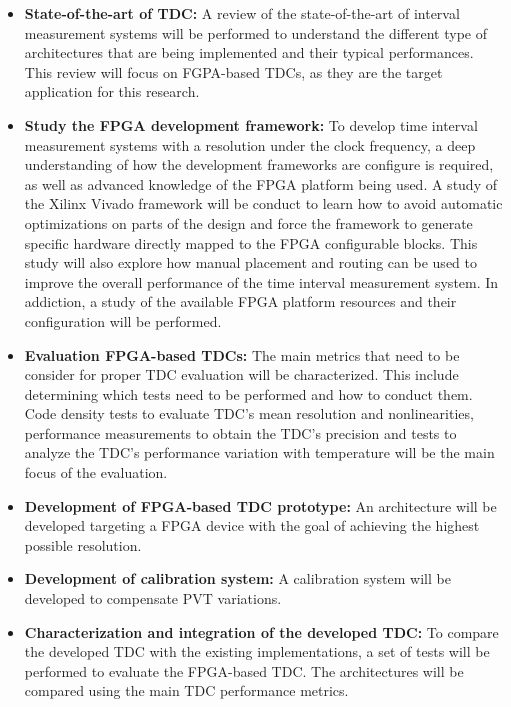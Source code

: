 \begin{itemize}
    \item \textbf{State-of-the-art of \gls{TDC}:} A review of the state-of-the-art of interval measurement systems will be performed to understand the different type of architectures that are being implemented and their typical performances. This review will focus on FGPA-based \glspl{TDC}, as they are the target application for this research.

    \item \textbf{Study the \gls{FPGA} development framework:} To develop time interval measurement systems with a resolution under the clock frequency, a deep understanding of how the development frameworks are configure is required, as well as advanced knowledge of the \gls{FPGA} platform being used. A study of the Xilinx Vivado framework will be conduct to learn how to avoid automatic optimizations on parts of the design and force the framework to generate specific hardware directly mapped to the \gls{FPGA} configurable blocks. This study will also explore how manual placement and routing can be used to improve  the overall performance of the time interval measurement system. In addiction, a study of the available \gls{FPGA} platform resources and their configuration will be performed.

    \item \textbf{Evaluation \gls{FPGA}-based \glspl{TDC}:} The main metrics that need to be consider for proper \gls{TDC} evaluation will be characterized. This include determining which tests need to be performed and how to conduct them. Code density tests to evaluate \gls{TDC}’s mean resolution and nonlinearities, performance measurements to obtain the \gls{TDC}’s precision and tests to analyze the \gls{TDC}'s performance variation with temperature will be the main focus of the evaluation.

    \item \textbf{Development of \gls{FPGA}-based \gls{TDC} prototype:} An architecture will be developed targeting a \gls{FPGA} device with the goal of achieving the highest possible resolution.

    \item \textbf{Development of calibration system:} A calibration system will be developed to compensate \gls{PVT} variations.

    \item \textbf{Characterization and integration of the developed \gls{TDC}:} To compare the developed \gls{TDC} with the existing implementations, a set of tests will be performed to evaluate the \gls{FPGA}-based \gls{TDC}. The architectures will be compared using the main \gls{TDC} performance metrics.
\end{itemize}


